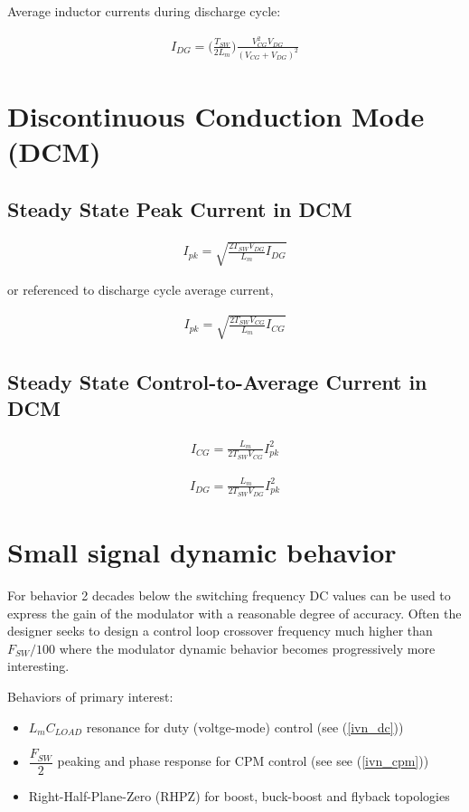 \documentclass{scrartcl}
\begin{document}
		   Average inductor currents during discharge cycle:

			\begin{align}
			I_{DG} = \bigg(\frac{T_{SW}}{2L_m}\bigg)\frac{V_{CG}^2 V_{DG}}{(V_{CG} + V_{DG})^2} 
			\end{align}		

	\section{Discontinuous Conduction Mode (DCM)}
	
		\subsection{Steady State Peak Current in DCM}
		
		\begin{align}
		I_{pk} = \sqrt{\frac{2T_{SW}V_{DG}}{L_m}I_{DG}}
		\end{align}	
		
		or referenced to discharge cycle average current,
	
		\begin{align}
		I_{pk} = \sqrt{\frac{2T_{SW}V_{CG}}{L_m}I_{CG}}
		\end{align}	
		
		\subsection{Steady State Control-to-Average Current in DCM}

		\begin{align}
		I_{CG} = \frac{L_m}{2T_{SW}V_{CG}}I_{pk}^2
		\end{align}	

		\begin{align}
		I_{DG} = \frac{L_m}{2T_{SW}V_{DG}}I_{pk}^2
		\end{align}	
	
	\section{Small signal dynamic behavior}
	For behavior 2 decades below the switching frequency DC values can be used to express the gain of the modulator with a reasonable degree of accuracy.  Often the designer seeks to design a control loop crossover frequency much higher than $F_{SW}/100$ where the modulator dynamic behavior becomes progressively more interesting. 
	
	Behaviors of primary interest:
	\begin{itemize}
		\item $L_m C_{LOAD}$ resonance for duty (voltge-mode) control (see (\ref{ivn_dc}))
		\item $\dfrac{F_{SW}}{2}$ peaking and phase response for CPM control (see see (\ref{ivn_cpm}))
		\item Right-Half-Plane-Zero (RHPZ) for boost, buck-boost and flyback topologies 
	\end{itemize}
	
\end{document}
